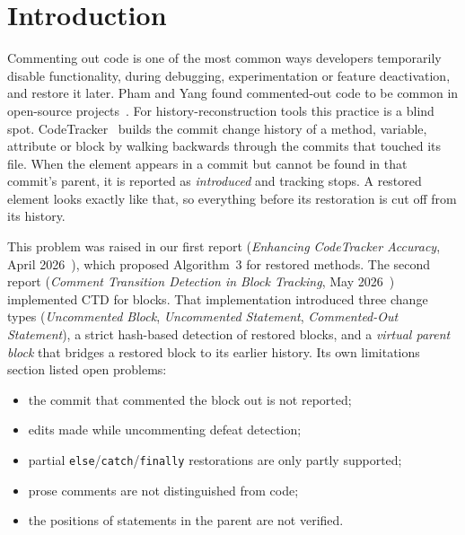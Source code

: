 \documentclass[11pt,a4paper]{article}
\newcommand{\code}[1]{\texttt{#1}}
\newcommand{\change}[1]{\textit{#1}}
\begin{document}
\section{Introduction}

Commenting out code is one of the most common ways developers temporarily disable functionality, during debugging, experimentation or feature deactivation, and restore it later. Pham and Yang found commented-out code to be common in open-source projects~\cite{pham2020}. For history-reconstruction tools this practice is a blind spot. CodeTracker~\cite{jodavi2022,hasan2024} builds the commit change history of a method, variable, attribute or block by walking backwards through the commits that touched its file. When the element appears in a commit but cannot be found in that commit's parent, it is reported as \emph{introduced} and tracking stops. A restored element looks exactly like that, so everything before its restoration is cut off from its history.

This problem was raised in our first report (\emph{Enhancing CodeTracker Accuracy}, April 2026~\cite{report1}), which proposed Algorithm~3 for restored methods. The second report (\emph{Comment Transition Detection in Block Tracking}, May 2026~\cite{report2}) implemented CTD for blocks. That implementation introduced three change types (\change{Uncommented Block}, \change{Uncommented Statement}, \change{Commented-Out Statement}), a strict hash-based detection of restored blocks, and a \emph{virtual parent block} that bridges a restored block to its earlier history. Its own limitations section listed open problems:
\begin{itemize}
  \item the commit that commented the block out is not reported;
  \item edits made while uncommenting defeat detection;
  \item partial \code{else}/\code{catch}/\code{finally} restorations are only partly supported;
  \item prose comments are not distinguished from code;
  \item the positions of statements in the parent are not verified.
\end{itemize}
\end{document}
